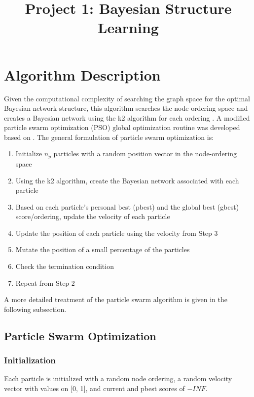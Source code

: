 \documentclass[twoside,11pt]{article}
\begin{document}
\title{Project 1: Bayesian Structure Learning}



\maketitle


\section{Algorithm Description}
Given the computational complexity of searching the graph space for the optimal Bayesian network structure, this algorithm searches the node-ordering space and creates a Bayesian network using the k2 algorithm for each ordering \cite{paper1, paper2}. A modified particle swarm optimization (PSO) global optimization routine was developed based on \cite{paper3}. The general formulation of particle swarm optimization is:
\begin{enumerate}
    \item Initialize $n_p$ particles with a random position vector in the node-ordering space
    \item Using the k2 algorithm, create the Bayesian network associated with each particle
    \item Based on each particle's personal best (pbest) and the global best (gbest) score/ordering, update the velocity of each particle
    \item Update the position of each particle using the velocity from Step 3
    \item Mutate the position of a small percentage of the particles
    \item Check the termination condition
    \item Repeat from Step $2$
\end{enumerate}

A more detailed treatment of the particle swarm algorithm is given in the following subsection.

\subsection{Particle Swarm Optimization}
\subsubsection{Initialization}
Each particle is initialized with a random node ordering, a random velocity vector with values on [0, 1], and current and  pbest scores of $-INF$.
\end{document}
